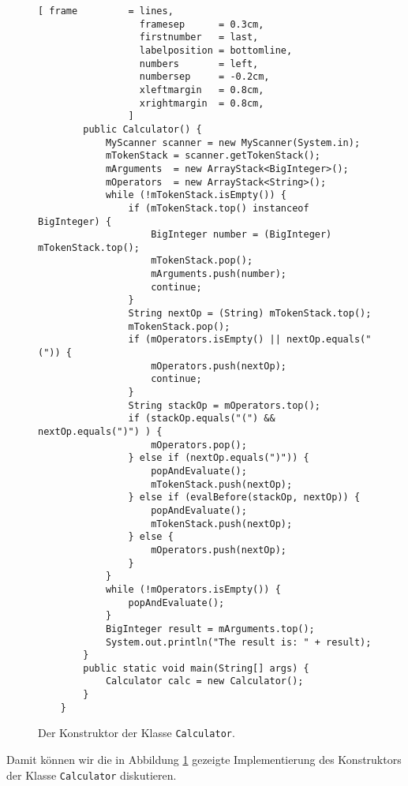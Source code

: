 \begin{figure}[!h]
  \centering
\begin{Verbatim}[ frame         = lines, 
                  framesep      = 0.3cm, 
                  firstnumber   = last,
                  labelposition = bottomline,
                  numbers       = left,
                  numbersep     = -0.2cm,
                  xleftmargin   = 0.8cm,
                  xrightmargin  = 0.8cm,
                ]
        public Calculator() {
            MyScanner scanner = new MyScanner(System.in);
            mTokenStack = scanner.getTokenStack();
            mArguments  = new ArrayStack<BigInteger>();
            mOperators  = new ArrayStack<String>();
            while (!mTokenStack.isEmpty()) {
                if (mTokenStack.top() instanceof BigInteger) {
                    BigInteger number = (BigInteger) mTokenStack.top();
                    mTokenStack.pop();
                    mArguments.push(number);
                    continue;
                } 
                String nextOp = (String) mTokenStack.top();
                mTokenStack.pop();
                if (mOperators.isEmpty() || nextOp.equals("(")) {
                    mOperators.push(nextOp);
                    continue;
                }
                String stackOp = mOperators.top();
                if (stackOp.equals("(") && nextOp.equals(")") ) {
                    mOperators.pop();
                } else if (nextOp.equals(")")) {
                    popAndEvaluate();
                    mTokenStack.push(nextOp);
                } else if (evalBefore(stackOp, nextOp)) {
                    popAndEvaluate();
                    mTokenStack.push(nextOp);
                } else {
                    mOperators.push(nextOp);
                }
            }
            while (!mOperators.isEmpty()) { 
                popAndEvaluate(); 
            }
            BigInteger result = mArguments.top();
            System.out.println("The result is: " + result);
        }    
        public static void main(String[] args) {
            Calculator calc = new Calculator();
        }
    }
\end{Verbatim}
\vspace*{-0.3cm}
  \caption{Der Konstruktor der  Klasse \texttt{Calculator}.}
  \label{fig:calculator3.java}
\end{figure}
\noindent
Damit k\"onnen wir die in Abbildung \ref{fig:calculator3.java} gezeigte
Implementierung des Konstruktors der Klasse \texttt{Calculator}
diskutieren.  
